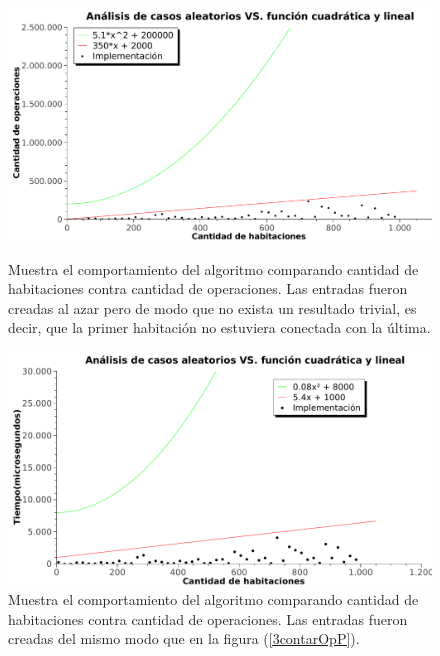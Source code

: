 
\begin{figure}[htb]
    \begin{minipage}{\textwidth}
	\begin{center}
		\includegraphics[width=\textwidth]{../ej3/graficos/3_ej_contarOperacionesP.pdf}
		\caption{Muestra el comportamiento del algoritmo comparando cantidad de habitaciones contra cantidad de operaciones. Las entradas fueron creadas al azar pero de modo que no exista un resultado trivial, es decir, que la primer habitación no estuviera conectada con la última.}
		\label{3contarOpP}
	\end{center}
    \end{minipage}

    \begin{minipage}{\textwidth}
	\begin{center}
		\includegraphics[width=\textwidth]{../ej3/graficos/3_ej_contarTiempoP.pdf}
		\caption{Muestra el comportamiento del algoritmo comparando cantidad de habitaciones contra cantidad de operaciones. Las entradas fueron creadas del mismo modo que en la figura (\ref{3contarOpP}).}
		\label{3contarTiempoP}
	\end{center}
    \end{minipage}

\end{figure}

